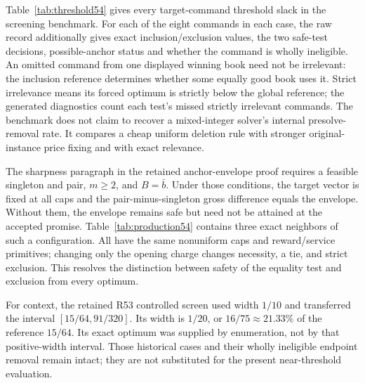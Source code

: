 Table~\ref{tab:threshold54} gives every target-command threshold slack in the screening benchmark. For each of the eight commands in each case, the raw record additionally gives exact inclusion/exclusion values, the two safe-test decisions, possible-anchor status and whether the command is wholly ineligible. An omitted command from one displayed winning book need not be irrelevant: the inclusion reference determines whether some equally good book uses it. Strict irrelevance means its forced optimum is strictly below the global reference; the generated diagnostics count each test's missed strictly irrelevant commands. The benchmark does not claim to recover a mixed-integer solver's internal presolve-removal rate. It compares a cheap uniform deletion rule with stronger original-instance price fixing and with exact relevance.

The sharpness paragraph in the retained anchor-envelope proof requires a feasible singleton and pair, $m\geq2$, and $B=\bar b$. Under those conditions, the target vector is fixed at all caps and the pair-minus-singleton gross difference equals the envelope. Without them, the envelope remains safe but need not be attained at the accepted promise. Table~\ref{tab:production54} contains three exact neighbors of such a configuration. All have the same nonuniform caps and reward/service primitives; changing only the opening charge changes necessity, a tie, and strict exclusion. This resolves the distinction between safety of the equality test and exclusion from every optimum.

For context, the retained R53 controlled screen used width $1/10$ and transferred the interval $[15/64,91/320]$. Its width is $1/20$, or $16/75\approx21.33\%$ of the reference $15/64$. Its exact optimum was supplied by enumeration, not by that positive-width interval. Those historical cases and their wholly ineligible endpoint removal remain intact; they are not substituted for the present near-threshold evaluation.

